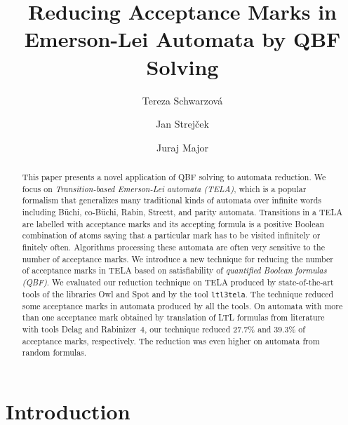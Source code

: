 \documentclass[a4paper,UKenglish,cleveref,autoref,thm-restate]{lipics-v2021}
\title{Reducing Acceptance Marks in Emerson-Lei Automata by QBF Solving}
\author{Tereza Schwarzov\'{a}}{%
  Masaryk University, Brno, Czech Republic}{xschwar3@mail.muni.cz}{https://orcid.org/0009-0001-9016-5399}{}
\author{Jan Strej\v{c}ek}{%
  Masaryk University, Brno, Czech Republic}{strejcek@fi.muni.cz}{https://orcid.org/0000-0001-5873-403X}{}
\author{Juraj Major}{%
  Masaryk University, Brno, Czech Republic}{major@fi.muni.cz}{https://orcid.org/0009-0007-1871-9047}{}
\begin{document}
\maketitle


\begin{abstract}
  This paper presents a novel application of QBF solving to automata
  reduction. We focus on \emph{Transition-based Emerson-Lei automata
    (TELA)}, which is a popular formalism that generalizes many
  traditional kinds of automata over infinite words including Büchi,
  co-Büchi, Rabin, Streett, and parity automata. Transitions in a TELA
  are labelled with acceptance marks and its accepting formula is a
  positive Boolean combination of atoms saying that a particular mark
  has to be visited infinitely or finitely
  often. %
  Algorithms processing these automata are often very sensitive to the
  number of %
  acceptance marks. We introduce a new technique for reducing the
  number of %
  acceptance marks in TELA based on satisfiability of \emph{quantified
    Boolean formulas (QBF)}.
  We evaluated our reduction technique on TELA produced by
  state-of-the-art tools of the libraries Owl and Spot and by the tool
  \texttt{ltl3tela}. The technique reduced some acceptance marks in
  automata produced by all the tools. On automata with more than one
  acceptance mark obtained by translation of LTL formulas from
  literature with tools Delag and Rabinizer~4, our
  technique reduced 27.7\% and 39.3\% of acceptance marks,
  respectively. The reduction was even higher on automata from random
  formulas.
\end{abstract}



\section{Introduction}
\end{document}
